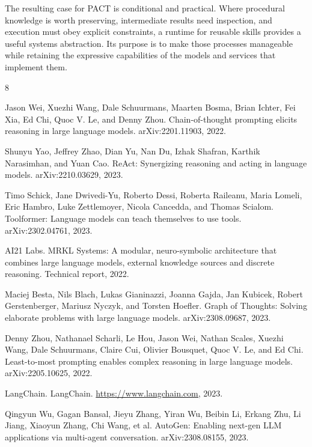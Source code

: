 \documentclass[10pt,twocolumn,a4paper]{article}
\begin{document}
The resulting case for PACT is conditional and practical. Where procedural knowledge is worth preserving, intermediate results need inspection, and execution must obey explicit constraints, a runtime for reusable skills provides a useful systems abstraction. Its purpose is to make those processes manageable while retaining the expressive capabilities of the models and services that implement them.


\begin{thebibliography}{8}
\small

 Jason Wei, Xuezhi Wang, Dale Schuurmans, Maarten Bosma, Brian Ichter, Fei Xia, Ed Chi, Quoc V. Le, and Denny Zhou. Chain-of-thought prompting elicits reasoning in large language models. arXiv:2201.11903, 2022.

 Shunyu Yao, Jeffrey Zhao, Dian Yu, Nan Du, Izhak Shafran, Karthik Narasimhan, and Yuan Cao. ReAct: Synergizing reasoning and acting in language models. arXiv:2210.03629, 2023.

 Timo Schick, Jane Dwivedi-Yu, Roberto Dessi, Roberta Raileanu, Maria Lomeli, Eric Hambro, Luke Zettlemoyer, Nicola Cancedda, and Thomas Scialom. Toolformer: Language models can teach themselves to use tools. arXiv:2302.04761, 2023.

 AI21 Labs. MRKL Systems: A modular, neuro-symbolic architecture that combines large language models, external knowledge sources and discrete reasoning. Technical report, 2022.

 Maciej Besta, Nils Blach, Lukas Gianinazzi, Joanna Gajda, Jan Kubicek, Robert Gerstenberger, Mariusz Nyczyk, and Torsten Hoefler. Graph of Thoughts: Solving elaborate problems with large language models. arXiv:2308.09687, 2023.

 Denny Zhou, Nathanael Scharli, Le Hou, Jason Wei, Nathan Scales, Xuezhi Wang, Dale Schuurmans, Claire Cui, Olivier Bousquet, Quoc V. Le, and Ed Chi. Least-to-most prompting enables complex reasoning in large language models. arXiv:2205.10625, 2022.

 LangChain. LangChain. \url{https://www.langchain.com,} 2023.

 Qingyun Wu, Gagan Bansal, Jieyu Zhang, Yiran Wu, Beibin Li, Erkang Zhu, Li Jiang, Xiaoyun Zhang, Chi Wang, et al. AutoGen: Enabling next-gen LLM applications via multi-agent conversation. arXiv:2308.08155, 2023.

\end{thebibliography}
\end{document}
